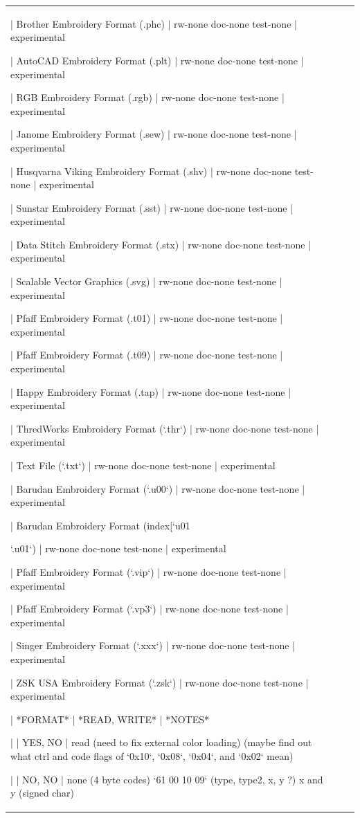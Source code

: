 \begin{tabular}{l l l}
{{| Brother Embroidery Format (.phc)
| rw-none doc-none test-none
| experimental

| AutoCAD Embroidery Format (.plt)
| rw-none doc-none test-none
| experimental

| RGB Embroidery Format (.rgb)
| rw-none doc-none test-none
| experimental

| Janome Embroidery Format (.sew)
| rw-none doc-none test-none
| experimental

| Husqvarna Viking Embroidery Format (.shv)
| rw-none doc-none test-none
| experimental

| Sunstar Embroidery Format (.sst)
| rw-none doc-none test-none
| experimental

| Data Stitch Embroidery Format (.stx)
| rw-none doc-none test-none
| experimental

| Scalable Vector Graphics (.svg)
| rw-none doc-none test-none
| experimental

| Pfaff Embroidery Format (.t01)
| rw-none doc-none test-none
| experimental

| Pfaff Embroidery Format (.t09)
| rw-none doc-none test-none
| experimental

| Happy Embroidery Format (.tap)
| rw-none doc-none test-none
| experimental

| ThredWorks Embroidery Format (`.thr`)
| rw-none doc-none test-none
| experimental

| Text File (`.txt`)
| rw-none doc-none test-none
| experimental

| Barudan Embroidery Format (`.u00`)
| rw-none doc-none test-none
| experimental

| Barudan Embroidery Format (index[`u01}}`.u01`)
| rw-none doc-none test-none
| experimental

| Pfaff Embroidery Format (`.vip`)
| rw-none doc-none test-none
| experimental

| Pfaff Embroidery Format (`.vp3`)
| rw-none doc-none test-none
| experimental

| Singer Embroidery Format (`.xxx`)
| rw-none doc-none test-none
| experimental

| ZSK USA Embroidery Format (`.zsk`)
| rw-none doc-none test-none
| experimental

| *FORMAT*
| *READ, WRITE*
| *NOTES*

| \index{\texttt{10o}}
| YES, NO
| read (need to fix external color loading) (maybe find out what ctrl and code flags of `0x10`, `0x08`, `0x04`, and `0x02` mean)

| \index{\texttt{100}}
| NO, NO
| none (4 byte codes) `61 00 10 09` (type, type2, x, y ?) x and y (signed char)


\end{tabular}
